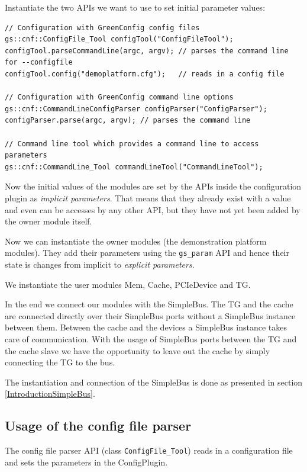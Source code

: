 Instantiate the two APIs we want to use to set initial parameter values:
\begin{lstlisting}
// Configuration with GreenConfig config files
gs::cnf::ConfigFile_Tool configTool("ConfigFileTool");
configTool.parseCommandLine(argc, argv); // parses the command line for --configfile
configTool.config("demoplatform.cfg");   // reads in a config file

// Configuration with GreenConfig command line options
gs::cnf::CommandLineConfigParser configParser("ConfigParser");
configParser.parse(argc, argv); // parses the command line

// Command line tool which provides a command line to access parameters
gs::cnf::CommandLine_Tool commandLineTool("CommandLineTool");
\end{lstlisting}

Now the initial values of the modules are set by the APIs inside the configuration plugin as \emph{implicit parameters}. That means that they already exist with a value and even can be accesses by any other API, but they have not yet been added by the owner module itself. 

Now we can instantiate the owner modules (the demonstration platform modules). They add their parameters using the \lstinline|gs_param| API and hence their state is changes from implicit to \emph{explicit parameters}.

We instantiate the user modules Mem, Cache, PCIeDevice and TG.

In the end we connect our modules with the SimpleBus. The TG and the cache are connected directly over their SimpleBus ports without a SimpleBus instance between them. Between the cache and the devices a SimpleBus instance takes care of communication. With the usage of SimpleBus ports between the TG and the cache slave we have the opportunity to leave out the cache by simply connecting the TG to the bus.

The instantiation and connection of the SimpleBus is done as presented in section \ref{IntroductionSimpleBus}.

\subsection{Usage of the config file parser}
\label{ConfigFileTool}

The config file parser API (class \lstinline|ConfigFile_Tool|) reads in a configuration file and sets the parameters in the ConfigPlugin.


